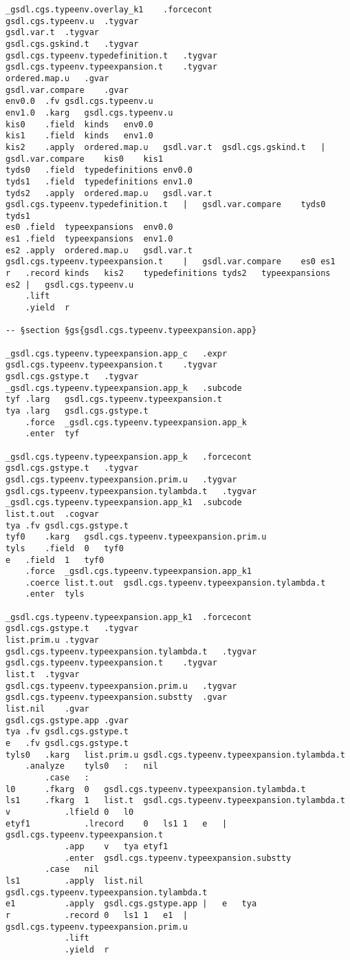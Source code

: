 \documentclass{report}
\begin{document}
\begin{verbatim}
_gsdl.cgs.typeenv.overlay_k1	.forcecont
gsdl.cgs.typeenv.u	.tygvar
gsdl.var.t	.tygvar
gsdl.cgs.gskind.t	.tygvar
gsdl.cgs.typeenv.typedefinition.t	.tygvar
gsdl.cgs.typeenv.typeexpansion.t	.tygvar
ordered.map.∪	.gvar
gsdl.var.compare	.gvar
env0.0	.fv	gsdl.cgs.typeenv.u
env1.0	.karg	gsdl.cgs.typeenv.u
kis0	.field	kinds	env0.0
kis1	.field	kinds	env1.0
kis2	.apply	ordered.map.∪	gsdl.var.t	gsdl.cgs.gskind.t	|	gsdl.var.compare	kis0	kis1
tyds0	.field	typedefinitions	env0.0
tyds1	.field	typedefinitions	env1.0
tyds2	.apply	ordered.map.∪	gsdl.var.t	gsdl.cgs.typeenv.typedefinition.t	|	gsdl.var.compare	tyds0	tyds1
es0	.field	typeexpansions	env0.0
es1	.field	typeexpansions	env1.0
es2	.apply	ordered.map.∪	gsdl.var.t	gsdl.cgs.typeenv.typeexpansion.t	|	gsdl.var.compare	es0	es1
r	.record	kinds	kis2	typedefinitions	tyds2	typeexpansions	es2	|	gsdl.cgs.typeenv.u
	.lift
	.yield	r

-- §section §gs{gsdl.cgs.typeenv.typeexpansion.app}

_gsdl.cgs.typeenv.typeexpansion.app_c	.expr
gsdl.cgs.typeenv.typeexpansion.t	.tygvar
gsdl.cgs.gstype.t	.tygvar
_gsdl.cgs.typeenv.typeexpansion.app_k	.subcode
tyf	.larg	gsdl.cgs.typeenv.typeexpansion.t
tya	.larg	gsdl.cgs.gstype.t
	.force	_gsdl.cgs.typeenv.typeexpansion.app_k
	.enter	tyf

_gsdl.cgs.typeenv.typeexpansion.app_k	.forcecont
gsdl.cgs.gstype.t	.tygvar
gsdl.cgs.typeenv.typeexpansion.prim.u	.tygvar
gsdl.cgs.typeenv.typeexpansion.tylambda.t	.tygvar
_gsdl.cgs.typeenv.typeexpansion.app_k1	.subcode
list.t.out	.cogvar
tya	.fv	gsdl.cgs.gstype.t
tyf0	.karg	gsdl.cgs.typeenv.typeexpansion.prim.u
tyls	.field	0	tyf0
e	.field	1	tyf0
	.force	_gsdl.cgs.typeenv.typeexpansion.app_k1
	.coerce	list.t.out	gsdl.cgs.typeenv.typeexpansion.tylambda.t
	.enter	tyls

_gsdl.cgs.typeenv.typeexpansion.app_k1	.forcecont
gsdl.cgs.gstype.t	.tygvar
list.prim.u	.tygvar
gsdl.cgs.typeenv.typeexpansion.tylambda.t	.tygvar
gsdl.cgs.typeenv.typeexpansion.t	.tygvar
list.t	.tygvar
gsdl.cgs.typeenv.typeexpansion.prim.u	.tygvar
gsdl.cgs.typeenv.typeexpansion.substty	.gvar
list.nil	.gvar
gsdl.cgs.gstype.app	.gvar
tya	.fv	gsdl.cgs.gstype.t
e	.fv	gsdl.cgs.gstype.t
tyls0	.karg	list.prim.u	gsdl.cgs.typeenv.typeexpansion.tylambda.t
	.analyze	tyls0	:	nil
		.case	:
l0		.fkarg	0	gsdl.cgs.typeenv.typeexpansion.tylambda.t
ls1		.fkarg	1	list.t	gsdl.cgs.typeenv.typeexpansion.tylambda.t
v			.lfield	0	l0
etyf1			.lrecord	0	ls1	1	e	|	gsdl.cgs.typeenv.typeexpansion.t
			.app	v	tya	etyf1
			.enter	gsdl.cgs.typeenv.typeexpansion.substty
		.case	nil
ls1			.apply	list.nil	gsdl.cgs.typeenv.typeexpansion.tylambda.t
e1			.apply	gsdl.cgs.gstype.app	|	e	tya
r			.record	0	ls1	1	e1	|	gsdl.cgs.typeenv.typeexpansion.prim.u
			.lift
			.yield	r


\end{verbatim}
\end{document}
